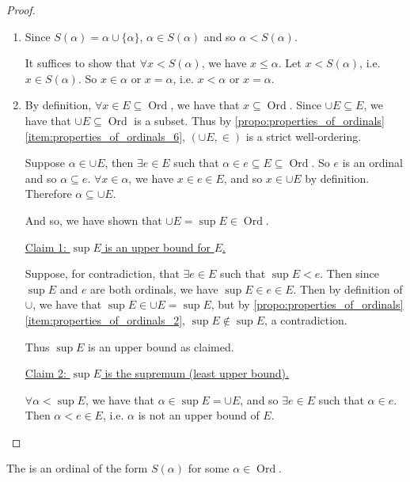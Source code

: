 \documentclass[notoc,notitlepage]{tufte-book}
\DeclareMathOperator{\Ord}{Ord }
\begin{document}
\begin{proof}
  \begin{enumerate}
    \item Since $S(\alpha) = \alpha \cup \{ \alpha \}$, $\alpha \in S(\alpha)$ and so $\alpha < S(\alpha)$.

      It suffices to show that $\forall x < S(\alpha)$, we have $x \leq \alpha$. Let $x < S(\alpha)$, i.e. $x \in S(\alpha)$. So $x \in \alpha$ or $x = \alpha$, i.e. $x < \alpha$ or $x = \alpha$.

    \item By definition, $\forall x \in E \subseteq \Ord$, we have that $x \subseteq \Ord$. Since $\cup E \subseteq E$, we have that $\cup E \subseteq \Ord$ is a subset. Thus by \cref{propo:properties_of_ordinals} \cref{item:properties_of_ordinals_6}, $(\cup E, \in)$ is a strict well-ordering.

       Suppose $\alpha \in \cup E$, then $\exists e \in E$ such that $\alpha \in e \subseteq E \subseteq \Ord$. So $e$ is an ordinal and so $\alpha \subseteq e$.  $\forall x \in \alpha$, we have $x \in e \in E$, and so $x \in \cup E$ by definition. Therefore $\alpha \subseteq \cup E$.

      And so, we have shown that $\cup E = \sup E \in \Ord$.

      \noindent\underline{Claim 1: $\sup E$ is an upper bound for $E$.}

      Suppose, for contradiction, that $\exists e \in E$ such that $\sup E < e$. Then since $\sup E$ and $e$ are both ordinals, we have $\sup E \in e \in E$. Then by definition of $\cup$, we have that $\sup E \in \cup E = \sup E$, but by \cref{propo:properties_of_ordinals} \cref{item:properties_of_ordinals_2}, $\sup E \notin \sup E$, a contradiction.

      Thus $\sup E$ is an upper bound as claimed.

      \noindent\underline{Claim 2: $\sup E$ is the supremum (least upper bound).}

      $\forall \alpha < \sup E$, we have that $\alpha \in \sup E = \cup E$, and so $\exists e \in E$ such that $\alpha \in e$. Then $\alpha < e \in E$, i.e. $\alpha$ is not an upper bound of $E$.
  \end{enumerate}
\end{proof}

\begin{defn}
\label{defn:successor_ordinal}
  The  is an ordinal of the form $S(\alpha)$ for some $\alpha \in \Ord$.
\end{defn}
\end{document}
